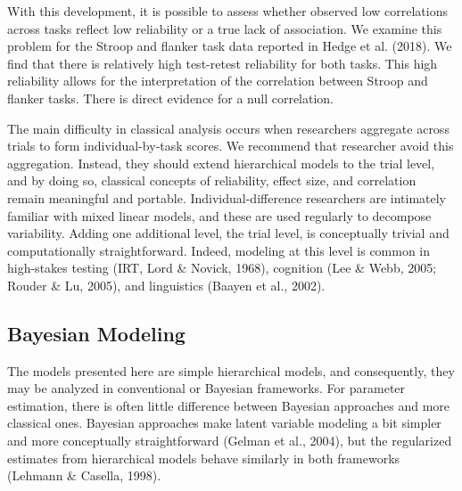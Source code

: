 \documentclass[english,man]{apa6}
\theoremstyle{definition}
\theoremstyle{definition}
\theoremstyle{remark}
\begin{document}
With this development, it is possible to assess whether observed low
correlations across tasks reflect low reliability or a true lack of
association. We examine this problem for the Stroop and flanker task
data reported in Hedge et al. (2018). We find that there is relatively
high test-retest reliability for both tasks. This high reliability
allows for the interpretation of the correlation between Stroop and
flanker tasks. There is direct evidence for a null correlation.

The main difficulty in classical analysis occurs when researchers
aggregate across trials to form individual-by-task scores. We recommend
that researcher avoid this aggregation. Instead, they should extend
hierarchical models to the trial level, and by doing so, classical
concepts of reliability, effect size, and correlation remain meaningful
and portable. Individual-difference researchers are intimately familiar
with mixed linear models, and these are used regularly to decompose
variability. Adding one additional level, the trial level, is
conceptually trivial and computationally straightforward. Indeed,
modeling at this level is common in high-stakes testing (IRT, Lord \&
Novick, 1968), cognition (Lee \& Webb, 2005; Rouder \& Lu, 2005), and
linguistics (Baayen et al., 2002).

\subsection{Bayesian Modeling}\label{bayesian-modeling}

The models presented here are simple hierarchical models, and
consequently, they may be analyzed in conventional or Bayesian
frameworks. For parameter estimation, there is often little difference
between Bayesian approaches and more classical ones. Bayesian approaches
make latent variable modeling a bit simpler and more conceptually
straightforward (Gelman et al., 2004), but the regularized estimates
from hierarchical models behave similarly in both frameworks (Lehmann \&
Casella, 1998).
\end{document}
